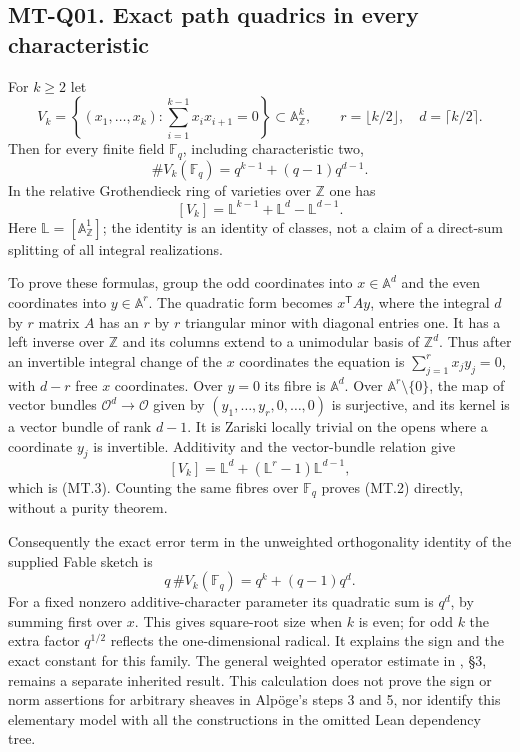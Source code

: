 \documentclass[11pt,a4paper]{article}
\begin{document}
\subsection*{MT-Q01. Exact path quadrics in every characteristic}
For $k\ge2$ let
\[
 V_k=\left\{(x_1,\ldots,x_k):\sum_{i=1}^{k-1}x_ix_{i+1}=0\right\}
       \subset\mathbb A^k_{\mathbb Z},\qquad
 r=\lfloor k/2\rfloor,\quad d=\lceil k/2\rceil.
\]
Then for every finite field $\mathbb F_q$, including characteristic two,
\[
 \#V_k(\mathbb F_q)=q^{k-1}+(q-1)q^{d-1}.                 \tag{MT.2}
\]
In the relative Grothendieck ring of varieties over $\mathbb Z$ one has
\[
                 [V_k]=\mathbb L^{k-1}+\mathbb L^d-\mathbb L^{d-1}.
                                                               \tag{MT.3}
\]
Here $\mathbb L=[\mathbb A^1_{\mathbb Z}]$; the identity is an identity of
classes, not a claim of a direct-sum splitting of all integral realizations.

To prove these formulas, group the odd coordinates into $x\in\mathbb A^d$
and the even coordinates into $y\in\mathbb A^r$.  The quadratic form
becomes $x^{\mathsf T}Ay$, where the integral $d$ by $r$ matrix $A$ has an
$r$ by $r$ triangular minor with diagonal entries one.  It has a left
inverse over $\mathbb Z$ and its columns extend to a unimodular basis of
$\mathbb Z^d$.  Thus after an invertible integral change of the $x$
coordinates the equation is $\sum_{j=1}^r x_jy_j=0$, with $d-r$ free
$x$ coordinates.  Over $y=0$ its fibre is $\mathbb A^d$.  Over
$\mathbb A^r\setminus\{0\}$, the map of vector bundles
$\mathcal O^d\to\mathcal O$ given by $(y_1,\ldots,y_r,0,\ldots,0)$ is
surjective, and its kernel is a vector bundle of rank $d-1$.
It is Zariski locally trivial on the opens where a coordinate $y_j$ is
invertible.  Additivity and the vector-bundle relation give
\[
 [V_k]=\mathbb L^d+(\mathbb L^r-1)\mathbb L^{d-1},
\]
which is (MT.3).  Counting the same fibres over $\mathbb F_q$ proves
(MT.2) directly, without a purity theorem.

Consequently the exact error term in the unweighted orthogonality identity
of the supplied Fable sketch is
\[
             q\,\#V_k(\mathbb F_q)=q^k+(q-1)q^d.
\]
For a fixed nonzero additive-character parameter its quadratic sum is
$q^d$, by summing first over $x$.  This gives square-root size when $k$ is
even; for odd $k$ the extra factor $q^{1/2}$ reflects the one-dimensional
radical.  It explains the sign and the exact constant for this family.
The general weighted operator estimate in
,
\S3, remains a separate inherited result.  This calculation does not prove
the sign or norm assertions for arbitrary sheaves in Alp\"oge's steps 3
and 5, nor identify this elementary model with all the constructions in
the omitted Lean dependency tree.
\end{document}

